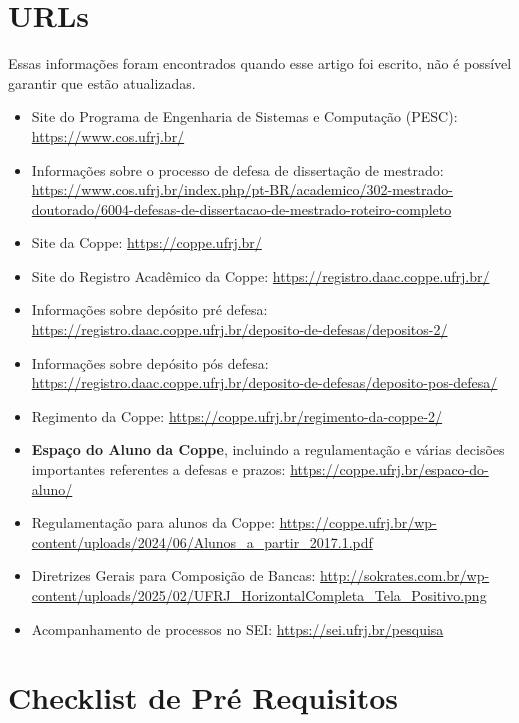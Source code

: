 \documentclass[a4paper,12pt]{article}
\begin{document}
\vspace{1cm} %
\appendix
\section{URLs}

Essas informações foram encontrados quando esse artigo foi escrito, não é possível garantir que estão atualizadas.

\begin{itemize}
\item Site do Programa de Engenharia de Sistemas e Computação (PESC): \url{https://www.cos.ufrj.br/}
    \item Informações sobre o processo de defesa de dissertação de mestrado: \url{https://www.cos.ufrj.br/index.php/pt-BR/academico/302-mestrado-doutorado/6004-defesas-de-dissertacao-de-mestrado-roteiro-completo}
    \item Site da Coppe: \url{https://coppe.ufrj.br/}
    \item Site do Registro Acadêmico da Coppe: \url{https://registro.daac.coppe.ufrj.br/}
    \item Informações sobre depósito pré defesa: \url{https://registro.daac.coppe.ufrj.br/deposito-de-defesas/depositos-2/}
    \item Informações sobre depósito pós defesa: \url{https://registro.daac.coppe.ufrj.br/deposito-de-defesas/deposito-pos-defesa/}
    \item Regimento da Coppe: \url{https://coppe.ufrj.br/regimento-da-coppe-2/}
    \item \textbf{Espaço do Aluno da Coppe}, incluindo a regulamentação e várias decisões importantes referentes a defesas e prazos: \url{https://coppe.ufrj.br/espaco-do-aluno/}
    \item Regulamentação para alunos da Coppe: \url{https://coppe.ufrj.br/wp-content/uploads/2024/06/Alunos_a_partir_2017.1.pdf}
    \item Diretrizes Gerais para Composição de Bancas: \url{http://sokrates.com.br/wp-content/uploads/2025/02/UFRJ_HorizontalCompleta_Tela_Positivo.png}
    \item Acompanhamento de processos no SEI: \url{https://sei.ufrj.br/pesquisa}
\end{itemize}

\clearpage
\section{Checklist de Pré Requisitos}
\end{document}
